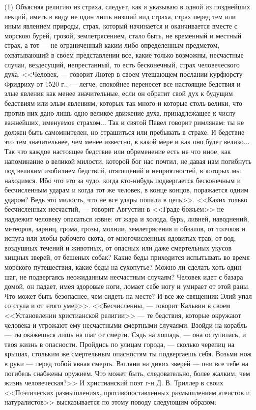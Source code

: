 \documentclass[12pt]{article}
\begin{document}
(1) Объясняя религию из страха, следует, как я указываю в одной из позднейших лекций, иметь в виду не один лишь низший вид страха, страх перед тем или иным явлением природы, страх, который начинается и оканчивается вместе с морскою бурей, грозой, землетрясением, стало быть, не временный и местный страх, а тот --- не ограниченный каким-либо определенным предметом, охватывающий в своем представлении все, какие только возможны, несчастные случаи, вездесущий, непрестанный, то есть бесконечный, страх человеческого духа. <<Человек, --- говорит Лютер в своем утешающем послании курфюрсту Фридриху от 1520 г., --- легче, спокойнее перенесет все настоящие бедствия и злые явления как менее значительные, если он обратит свой дух к будущим бедствиям или злым явлениям, которых так много и которые столь велики, что против них дано лишь одно великое движение духа, принадлежащее к числу важнейших, именуемое страхом... Так и святой Павел говорит римлянам: ты не должен быть самомнителен, но страшиться или пребывать в страхе. И бедствие это тем значительнее, чем менее известно, в какой мере и как оно будет велико... Так что каждое настоящее бедствие или обременение есть не что иное, как напоминание о великой милости, которой бог нас почтил, не давая нам погибнуть под великим изобилием бедствий, отягощений и неприятностей, в которых мы находимся. Ибо что это за чудо, когда кто-нибудь подвергается бесконечным и бесчисленным ударам и когда тот же человек, в конце концов, поражается одним ударом? Ведь это милость, что не все удары попали в цель>>. <<Каких только бесчисленных несчастий, --- говорит Августин в <<Граде божьем>>  не надлежит человеку опасаться извне: от жара и холода, бурь, ливней, наводнений, метеоров, зарниц, грома, грозы, молнии, землетрясения и обвалов, от толчков и испуга или злобы рабочего скота, от многочисленных ядовитых трав, от вод, воздушных течений и животных, от опасных или даже смертельных укусов хищных зверей, от бешеных собак? Какие беды приходится испытывать во время морского путешествия, какие беды на сухопутье? Можно ли сделать хоть один шаг, не подвергаясь неожиданным несчастным случаям? Человек идет с базара домой, он падает, имея здоровые ноги, ломает себе ногу и умирает от этой раны. Что может быть безопаснее, чем сидеть на месте? И все же священник Элий упал со стула и от этого умер>>. <<Бесчисленны, --- говорит Кальвин в своем <<Установлении христианской религии>>  --- те бедствия, которые окружают человека и угрожают ему несчастными смертными случаями. Взойди на корабль --- ты окажешься лишь на шаг от смерти. Сядь на лошадь, --- она оступилась, и твоя жизнь в опасности. Пройдись по улицам города, --- сколько черепиц на крышах, стольким же смертельным опасностям ты подвергаешь себя. Возьми нож в руки --- перед тобой явная смерть. Взгляни на диких зверей --- они все тебе на погибель снабжены оружием. Что может быть, следовательно, более жалким, чем жизнь человеческая?>> И христианский поэт г-н Д. В. Триллер в своих <<Поэтических размышлениях, противопоставленных размышлениям атеистов и натуралистов>> высказывается по этому поводу следующим образом: 
\end{document}
